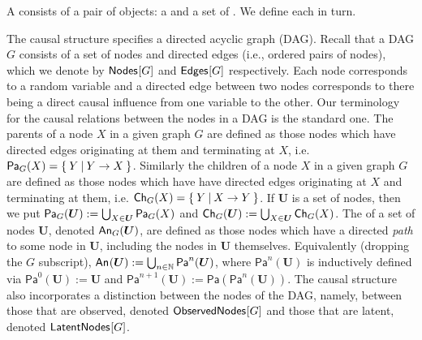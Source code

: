 A  consists of a pair of objects: a  and a set of .  We define each in turn.

The causal structure specifies a directed acyclic graph (DAG).  Recall that a DAG $G$ consists of a set of nodes and directed edges (i.e., ordered pairs of nodes), which we denote by $\nodes{G}$ and $\edges{G}$ respectively.  Each node corresponds to a random variable and a directed edge between two nodes corresponds to there being a direct causal influence from one variable to the other.   Our terminology for the causal relations between the nodes in a DAG is the standard one. The parents of a node $X$ in a given graph $G$ are defined as those nodes which have directed edges originating at them and terminating at $X$, i.e. $\Pa[G]{X} = \{\:Y\:|\:Y\to X\:\}$.  Similarly the children of a node $X$ in a given graph $G$ are defined as those nodes which have have directed edges originating at $X$ and terminating at them, i.e. $\Ch[G]{X} = \{\:Y\:|\: X\to Y\:\}$. If $\bm{U}$ is a set of nodes, then we put $\Pa[G]{\bm{U}} := \bigcup_{X\in\bm{U}} \Pa[G]{X}$ and $\Ch[G]{\bm{U}} := \bigcup_{X\in\bm{U}} \Ch[G]{X}$.  The  of a set of nodes $\bm{U}$, denoted $\An[G]{\bm{U}}$, are defined as those nodes which have a directed \emph{path} to some node in $\bm{U}$, including the nodes in $\bm{U}$ themselves. Equivalently (dropping the $G$ subscript), $\An{\bm{U}} := \bigcup_{n\in\mathbb{N}} \mathsf{Pa}^n(\bm{U})$, where $\mathsf{Pa}^n(\bm{U})$ is inductively defined via $\mathsf{Pa}^0(\bm{U}) := \bm{U}$ and $\mathsf{Pa}^{n+1}(\bm{U}) := \mathsf{Pa}(\mathsf{Pa}^n(\bm{U}))$.  The causal structure also incorporates a distinction between the nodes of the DAG, namely, between those that are observed, denoted $\SmallNamedFunction{ObservedNodes}{G}$ and those that are latent, denoted $\SmallNamedFunction{LatentNodes}{G}$.

